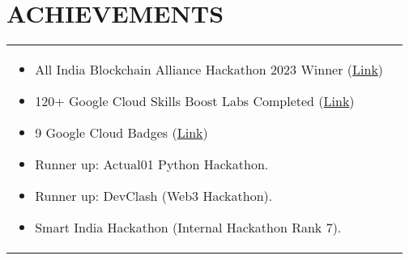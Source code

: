\documentclass[a4paper,8pt]{article}
\begin{document}
\section{\textbf{ACHIEVEMENTS}}
\begin{tabularx}{\linewidth}{ @{}l r@{} }
\begin{minipage}[t]{\linewidth}
    \begin{itemize}[nosep,after=\strut, leftmargin=1em, itemsep=2pt]
        \item All India Blockchain Alliance Hackathon 2023 Winner (\href{https://drive.google.com/file/d/1Z7MJC7KW8R31a5CgrEwE7D2boVf6nebi/view}{Link})
        \item 120+ Google Cloud Skills Boost Labs Completed (\href{https://www.cloudskillsboost.google/public_profiles/092c7019-a54d-4eb6-9c63-cc42c4bc8909}{Link})
        \item 9 Google Cloud Badges (\href{https://www.cloudskillsboost.google/public_profiles/092c7019-a54d-4eb6-9c63-cc42c4bc8909}{Link})
        \item Runner up: Actual01 Python Hackathon.
        \item Runner up: DevClash (Web3 Hackathon).
        \item Smart India Hackathon (Internal Hackathon Rank 7).
    \end{itemize}
\end{minipage}
\end{tabularx}
\end{document}
